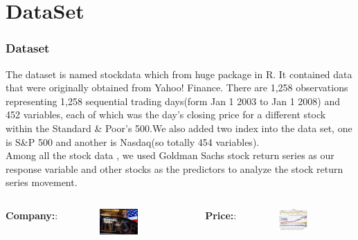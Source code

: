 \documentclass{beamer}
\begin{document}
\section{DataSet}
\begin{frame}
\frametitle{Dataset}
The dataset is named stockdata which from huge package in R. It contained data that were
originally obtained from Yahoo! Finance. There are 1,258
observations representing 1,258 sequential trading days(form Jan 1 2003 to Jan 1 2008) and 452
variables, each of which was the day's closing price for a different
stock within the Standard \& Poor's 500.We also added two index into the data set, one is S\&P 500 and another is Nasdaq(so totally 454 variables).\\
Among all the stock data , we used Goldman Sachs stock return
series as our response variable and other stocks as the predictors to analyze the stock return series movement.
\begin{columns}
\column{2.3in}
\textbf{Company:}:
 \begin{figure}
     \includegraphics[width=0.6\textwidth, height=0.25\textheight]{gschart.jpg}
\end{figure}

\column{2.3in}

\textbf{Price:}:
\begin{figure}
     \includegraphics[width=0.6\textwidth, height=0.3\textheight]{gs_plot.jpg}
\end{figure}

\end{columns}
\end{frame}
\end{document}

